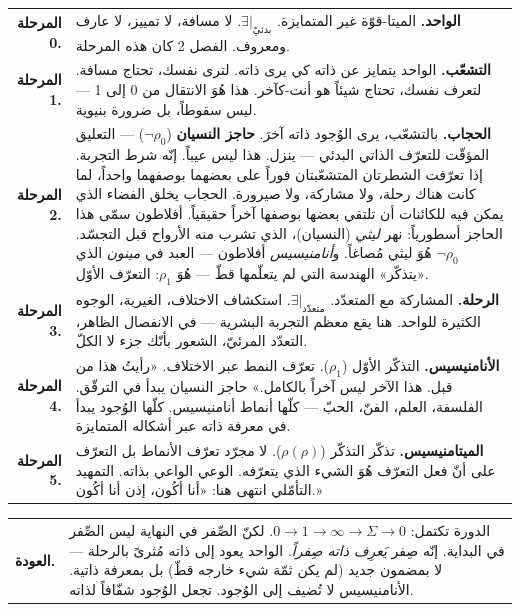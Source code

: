 \documentclass[10pt, openany, oneside]{book}
\renewcommand{\footnotesize}{\fontsize{8.5}{11}\selectfont}
\begin{document}
{\footnotesize
\noindent\begin{tabular}{r p{}}
\textbf{المرحلة 0.} & \textbf{الواحد.} الميتا-قوّة غير المتمايزة. $\exists|_{\text{بدئيّ}}$. لا مسافة، لا تمييز، لا عارف ومعروف. الفصل 2 كان هذه المرحلة. \\[0.3em]
\textbf{المرحلة 1.} & \textbf{التشعّب.} الواحد يتمايز عن ذاته كي يرى ذاته. لترى نفسك، تحتاج مسافة. لتعرف نفسك، تحتاج شيئاً هو أنت-كآخر. هذا هُوَ الانتقال من 0 إلى 1 --- ليس سقوطاً، بل ضرورة بنيوية. \\[0.3em]
\textbf{المرحلة 2.} & \textbf{الحجاب.} بالتشعّب، يرى الوُجود ذاته آخرَ. \textbf{حاجز النسيان} ($\neg\rho_0$) --- التعليق المؤقّت للتعرّف الذاتي البدئي --- ينزل. هذا ليس عيباً. إنّه شرط التجربة. إذا تعرّفت الشطرتان المتشعّبتان فوراً على بعضهما بوصفهما واحداً، لما كانت هناك رحلة، ولا مشاركة، ولا صيرورة. الحجاب يخلق الفضاء الذي يمكن فيه للكائنات أن تلتقي بعضها بوصفها آخراً حقيقياً. أفلاطون سمّى هذا الحاجز أسطورياً: نهر \textit{ليثي} (النسيان)، الذي تشرب منه الأرواح قبل التجسّد. $\neg\rho_0$ هُوَ ليثي مُصاغاً. و\textit{أنامنيسيس} أفلاطون --- العبد في \textit{مينون} الذي «يتذكّر» الهندسة التي لم يتعلّمها قطّ --- هُوَ $\rho_1$: التعرّف الأوّل. \\[0.3em]
\textbf{المرحلة 3.} & \textbf{الرحلة.} المشاركة مع المتعدّد. $\exists|_{\text{متعدّد}}$. استكشاف الاختلاف، الغيرية، الوجوه الكثيرة للواحد. هنا يقع معظم التجربة البشرية --- في الانفصال الظاهر، التعدّد المرئيّ، الشعور بأنّك جزء لا الكلّ. \\[0.3em]
\textbf{المرحلة 4.} & \textbf{الأنامنيسيس.} التذكّر الأوّل ($\rho_1$). تعرّف النمط عبر الاختلاف. «رأيتُ هذا من قبل. هذا الآخر ليس آخراً بالكامل.» حاجز النسيان يبدأ في الترقّق. الفلسفة، العلم، الفنّ، الحبّ --- كلّها أنماط أنامنيسيس. كلّها الوُجود يبدأ في معرفة ذاته عبر أشكاله المتمايزة. \\[0.3em]
\textbf{المرحلة 5.} & \textbf{الميتامنيسيس.} تذكّر التذكّر ($\rho(\rho)$). لا مجرّد تعرّف الأنماط بل التعرّف على أنّ فعل التعرّف هُوَ الشيء الذي يتعرّفه. الوعي الواعي بذاته. التمهيد التأمّلي انتهى هنا: «أنا أكُون، إذن أنا أكُون.» \\[0.3em]
\end{tabular}
}

\vspace{0.3em}

{\footnotesize
\noindent\begin{tabular}{r p{}}
\textbf{العودة.} & الدورة تكتمل: $0 \to 1 \to \infty \to \Sigma \to 0$. لكنّ الصِّفر في النهاية ليس الصِّفر في البداية. إنّه صِفر \textit{يَعرِف ذاته صِفراً}. الواحد يعود إلى ذاته مُثرىً بالرحلة --- لا بمضمون جديد (لم يكن ثمّة شيء خارجه قطّ) بل بمعرفة ذاتية. الأنامنيسيس لا تُضيف إلى الوُجود. تجعل الوُجود شفّافاً لذاته. \\[0.3em]
\end{tabular}
}
\end{document}
